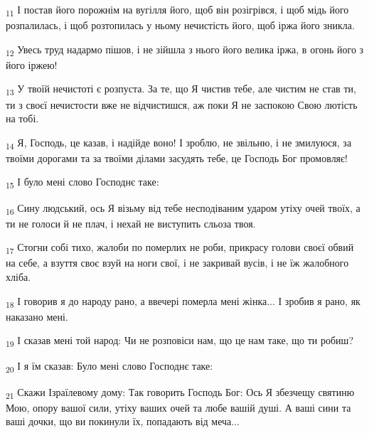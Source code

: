 \begin{tcolorbox}
\textsubscript{11} І постав його порожнім на вугілля його, щоб він розігрівся, і щоб мідь його розпалилась, і щоб розтопилась у ньому нечистість його, щоб іржа його зникла.
\end{tcolorbox}
\begin{tcolorbox}
\textsubscript{12} Увесь труд надармо пішов, і не зійшла з нього його велика іржа, в огонь його з його іржею!
\end{tcolorbox}
\begin{tcolorbox}
\textsubscript{13} У твоїй нечистоті є розпуста. За те, що Я чистив тебе, але чистим не став ти, ти з своєї нечистости вже не відчистишся, аж поки Я не заспокою Свою лютість на тобі.
\end{tcolorbox}
\begin{tcolorbox}
\textsubscript{14} Я, Господь, це казав, і надійде воно! І зроблю, не звільню, і не змилуюся, за твоїми дорогами та за твоїми ділами засудять тебе, це Господь Бог промовляє!
\end{tcolorbox}
\begin{tcolorbox}
\textsubscript{15} І було мені слово Господнє таке:
\end{tcolorbox}
\begin{tcolorbox}
\textsubscript{16} Сину людський, ось Я візьму від тебе несподіваним ударом утіху очей твоїх, а ти не голоси й не плач, і нехай не виступить сльоза твоя.
\end{tcolorbox}
\begin{tcolorbox}
\textsubscript{17} Стогни собі тихо, жалоби по померлих не роби, прикрасу голови своєї обвий на себе, а взуття своє взуй на ноги свої, і не закривай вусів, і не їж жалобного хліба.
\end{tcolorbox}
\begin{tcolorbox}
\textsubscript{18} І говорив я до народу рано, а ввечері померла мені жінка... І зробив я рано, як наказано мені.
\end{tcolorbox}
\begin{tcolorbox}
\textsubscript{19} І сказав мені той народ: Чи не розповіси нам, що це нам таке, що ти робиш?
\end{tcolorbox}
\begin{tcolorbox}
\textsubscript{20} І я їм сказав: Було мені слово Господнє таке:
\end{tcolorbox}
\begin{tcolorbox}
\textsubscript{21} Скажи Ізраїлевому дому: Так говорить Господь Бог: Ось Я збезчещу святиню Мою, опору вашої сили, утіху ваших очей та любе вашій душі. А ваші сини та ваші дочки, що ви покинули їх, попадають від меча...
\end{tcolorbox}
